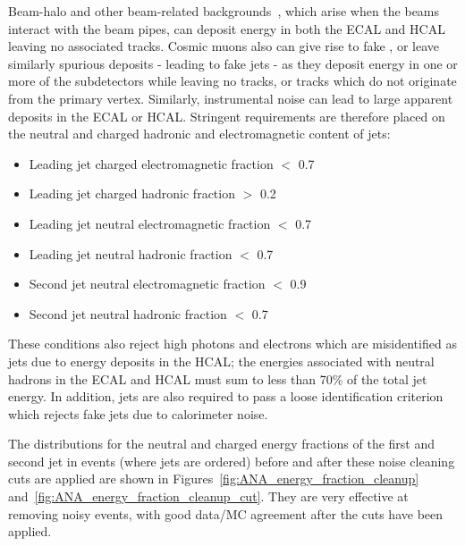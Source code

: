 Beam-halo and other beam-related backgrounds~\cite{bib:ANA_BeamHalo}, which arise when the beams interact with the beam pipes, 
can deposit energy in both the \ac{ECAL} and \ac{HCAL} leaving no associated tracks.
Cosmic muons also can give rise to fake \MET, 
or leave similarly spurious deposits - leading to fake jets - as they deposit energy in one or more of the subdetectors while leaving no tracks, or tracks which do not originate from the primary vertex.
Similarly, instrumental noise can lead to large apparent deposits in the \ac{ECAL} or \ac{HCAL}. 
Stringent requirements are therefore placed on the neutral and charged hadronic and electromagnetic content of jets:
\begin{itemize}
\item Leading jet charged electromagnetic fraction $<$ 0.7
\item Leading jet charged hadronic fraction $>$ 0.2
\item Leading jet neutral electromagnetic fraction $<$ 0.7
\item Leading jet neutral hadronic fraction $<$ 0.7
\item Second jet neutral electromagnetic fraction $<$ 0.9
\item Second jet neutral hadronic fraction $<$ 0.7
\end{itemize}
These conditions also reject high \pt{} photons and electrons which are misidentified as jets due to 
energy deposits in the \ac{HCAL}; the energies associated with neutral hadrons in the 
ECAL and HCAL must sum to less than 70\% of the total jet energy.
In addition, jets are also required to pass a loose identification criterion which rejects fake jets due to calorimeter noise. 

The distributions for the neutral and charged energy fractions of the first and second jet in events (where jets are \pt{} ordered) before and after these noise cleaning cuts are applied are shown in Figures~\ref{fig:ANA_energy_fraction_cleanup} and~\ref{fig:ANA_energy_fraction_cleanup_cut}. 
They are very effective at removing noisy events, with good data/MC agreement after the cuts have been applied.


